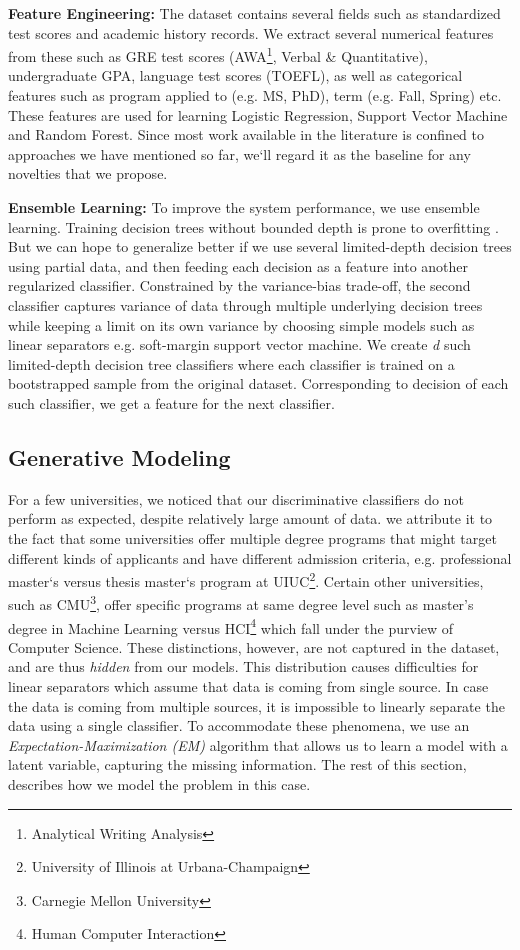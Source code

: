 \documentclass{sig-alternate-05-2015}
\begin{document}
\textbf{Feature Engineering:}
The dataset contains several fields such as standardized test scores and academic history records. We extract several numerical features from these such as GRE test scores (AWA\footnote{Analytical Writing Analysis}, Verbal \& Quantitative), undergraduate GPA, language test scores (TOEFL), as well as categorical features such as program applied to (e.g. MS, PhD), term (e.g. Fall, Spring) etc. These features are used for learning Logistic Regression, Support Vector Machine and Random Forest. Since most work available in the literature is confined to approaches we have mentioned so far, we`ll regard it as the baseline for any novelties that we propose.

\textbf{Ensemble Learning:}
To improve the system performance, we use ensemble learning. Training decision trees without bounded depth is prone to overfitting \cite{tree-overfitting}. But we can hope to generalize better if we use several limited-depth decision trees using partial data, and then feeding each decision as a feature into another regularized classifier. Constrained by the variance-bias trade-off, the second classifier captures variance of data through multiple underlying decision trees while keeping a limit on its own variance by choosing simple models such as linear separators e.g. soft-margin support vector machine. We create \textit{d} such limited-depth decision tree classifiers where each classifier is trained on a bootstrapped sample from the original dataset. Corresponding to decision of each such classifier, we get a feature for the next classifier.


\subsection{Generative Modeling}
\label{subsec:generative-modeling}
For a few universities, we noticed that our discriminative classifiers do not perform as expected, despite relatively large amount of data. we attribute it to the fact that some universities offer multiple degree programs that might target different kinds of applicants and have different admission criteria, e.g. professional master`s versus thesis master`s program at UIUC\footnote{University of Illinois at Urbana-Champaign}. Certain other universities, such as CMU\footnote{Carnegie Mellon University}, offer specific programs at same degree level such as master's degree in Machine Learning versus HCI\footnote{Human Computer Interaction} which fall under the purview of Computer Science. These distinctions, however, are not captured in the dataset, and are thus \textit{hidden} from our models. This distribution causes difficulties for linear separators which assume that data is coming from single source. In case the data is coming from multiple sources, it is impossible to linearly separate the data using a single classifier. To accommodate these phenomena, we use an \textit{Expectation-Maximization (EM)} algorithm that allows us to learn a model with a latent variable, capturing the missing information. The rest of this section, describes how we model the problem in this case.
\end{document}
